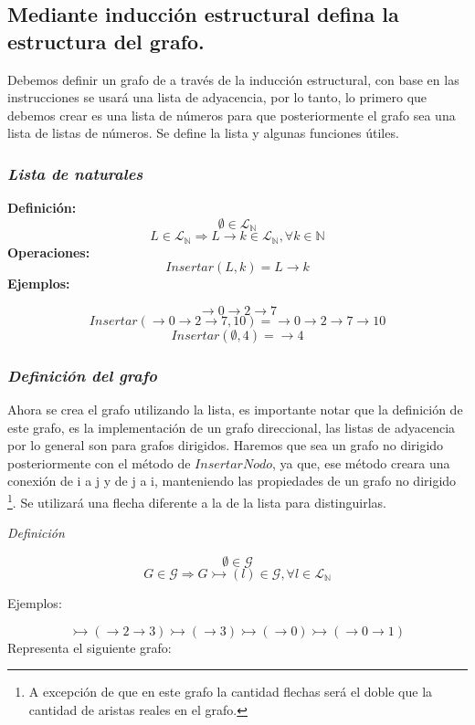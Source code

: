 \documentclass{article}
\begin{document}
\subsection{Mediante inducción estructural defina la estructura del grafo.}
Debemos definir un grafo de a través de la inducción estructural, con base en 
las instrucciones se usará una lista de adyacencia, por lo tanto, lo primero que
debemos crear es una lista de números para que posteriormente el grafo sea una 
lista de listas de números. Se define la lista y algunas funciones útiles.

\subsubsection*{\emph{Lista de naturales}}
\textbf{Definición:}
\[ \emptyset \in \mathcal{L}_{\mathbb{N}} \]
\[ L \in \mathcal{L}_\mathbb{N} \Rightarrow L \rightarrow k \in \mathcal{L}_\mathbb{N}, \forall k \in \mathbb{N}\]
\textbf{Operaciones:}
\[ Insertar(L, k) = L \rightarrow k\]
\newline
\textbf{Ejemplos:}

\[ \rightarrow 0 \rightarrow 2 \rightarrow 7 \]
\[ Insertar(\rightarrow 0 \rightarrow 2 \rightarrow 7, 10) =  \rightarrow 0 \rightarrow 2 \rightarrow 7 \rightarrow 10\]
\[ Insertar(\emptyset, 4) = \rightarrow 4 \]

\subsubsection*{\emph{Definición del grafo}}
Ahora se crea el grafo utilizando la lista, es importante notar que la definición 
de este grafo, es la implementación de un grafo direccional, las listas 
de adyacencia por lo general son para grafos dirigidos. Haremos que sea un grafo
no dirigido posteriormente con el método de $InsertarNodo$, ya que, ese método creara 
una conexión de i a j y de j a i, manteniendo las propiedades de un grafo no dirigido
\footnote{A excepción de que en este grafo la cantidad flechas será el doble que la 
cantidad de aristas reales en el grafo.}. Se utilizará una flecha diferente a la 
de la lista para distinguirlas.

\emph{Definición}

\[ \emptyset \in \mathcal{G} \]
\[ G \in \mathcal{G} \Rightarrow G \rightarrowtail (l) \in \mathcal{G} , \forall l \in \mathcal{L}_\mathbb{N} \]

Ejemplos:

\[ \rightarrowtail ( \rightarrow 2 \rightarrow 3) \rightarrowtail (\rightarrow 3) \rightarrowtail (\rightarrow 0) \rightarrowtail (\rightarrow 0 \rightarrow 1) \]
Representa el siguiente grafo: 
\end{document}

